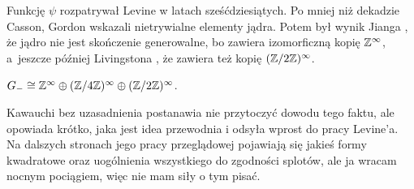 Funkcję $\psi$ rozpatrywał Levine \cite{levine1969} w latach sześćdziesiątych.
%
Po mniej niż dekadzie Casson, Gordon \cite{casson1978} wskazali nietrywialne elementy jądra.
%
%
Potem był wynik Jianga \cite{jiang1981}, że jądro nie jest skończenie generowalne, bo zawiera izomorficzną kopię $\mathbb Z^\infty$, a~jeszcze później Livingstona \cite{livingston1999}, że zawiera też kopię $(\mathbb Z/2\mathbb Z)^\infty$.

\begin{proposition}
    $G_- \cong \mathbb Z^\infty \oplus (\mathbb Z/4\mathbb Z)^\infty \oplus (\mathbb Z/2\mathbb Z)^\infty$.
\end{proposition}

Kawauchi \cite[s. 161]{kawauchi1996} bez uzasadnienia postanawia nie przytoczyć dowodu tego faktu, ale opowiada krótko, jaka jest idea przewodnia i odsyła wprost do pracy Levine'a.
Na dalszych stronach jego pracy przeglądowej pojawiają się jakieś formy kwadratowe oraz uogólnienia wszystkiego do zgodności splotów, ale ja wracam nocnym pociągiem, więc nie mam siły o tym pisać.

